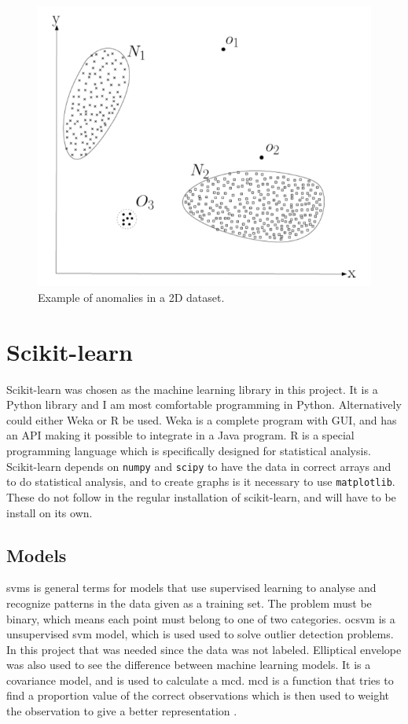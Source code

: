 \begin{figure}
\centering
\includegraphics[scale=0.3]{figs/anomaly_example.png}
\caption{\label{fig:anomalyExample}Example of anomalies in a 2D dataset\citep{chandola2009anomaly}.}
\end{figure}



\section{Scikit-learn}
Scikit-learn was chosen as the machine learning library in this project. It is a Python library and I am most comfortable programming in Python. Alternatively could either Weka or R be used. Weka is a complete program with GUI, and has an API making it possible to integrate in a Java program. R is a special programming language which is specifically designed for statistical analysis. Scikit-learn depends on \texttt{numpy} and \texttt{scipy} to have the data in correct arrays and to do statistical analysis, and to create graphs is it necessary to use \texttt{matplotlib}. These do not follow in the regular installation of scikit-learn, and will have to be install on its own. 

\subsection{Models}
\glspl{svm} is general terms for models that use supervised learning to analyse and recognize patterns in the data given as a training set. The problem must be binary, which means each point must belong to one of two categories. \gls{ocsvm} is a unsupervised \gls{svm} model, which is used used to solve outlier detection problems. In this project that was needed since the data was not labeled. Elliptical envelope was also used to see the difference between machine learning models. It is a covariance model, and is used to calculate a \gls{mcd}. \gls{mcd} is a function that tries to find a proportion value of the correct observations which is then used to weight the observation to give a better representation \cite{scikit-learn}.